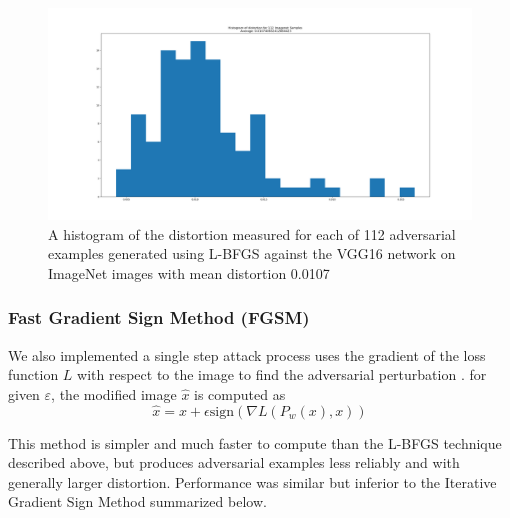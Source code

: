 \documentclass[10pt]{extarticle}
\newcommand{\sign}{\text{sign}}
\newcommand{\e}{\varepsilon}
\begin{document}

\begin{figure}[H]
\label{lbfgsi}
\includegraphics[trim=200 80 100 100, clip,width=14cm]{2019-04-10-adverse/imnet_examples/distortion_hist.png}
\caption{A histogram of the distortion measured for each of 112 adversarial examples generated using L-BFGS against the VGG16 network on ImageNet images with mean distortion 0.0107}
\end{figure}

\subsubsection{Fast Gradient Sign Method (FGSM)} 

  We also implemented a single step attack process uses the gradient of the loss function $L$ with respect to the image to find the adversarial perturbation \cite{goodfellow_explaining_2014}. for given $\e$, the modified image $\hat x$ is computed as
\begin{equation}
\hat{x} = x + \epsilon \text{sign} (\nabla L (P_w(x),x))
\end{equation}

This method is simpler and much faster to compute than the L-BFGS technique described above, but produces adversarial examples less reliably and with generally larger distortion. Performance was similar but inferior to the Iterative Gradient Sign Method summarized below.  
\end{document}
